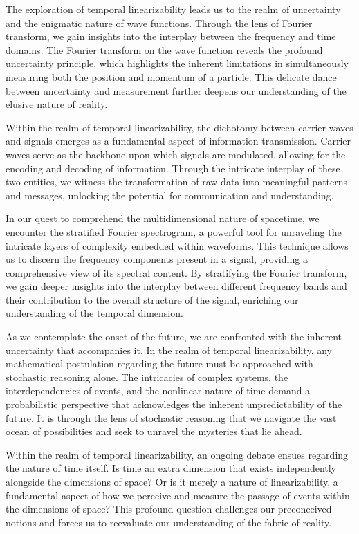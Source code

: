 \documentclass[ebook,12pt,oneside,openany]{memoir}
\begin{document}
\indent The exploration of temporal linearizability leads us to the realm of uncertainty and the enigmatic nature of wave functions. Through the lens of Fourier transform, we gain insights into the interplay between the frequency and time domains. The Fourier transform on the wave function reveals the profound uncertainty principle, which highlights the inherent limitations in simultaneously measuring both the position and momentum of a particle. This delicate dance between uncertainty and measurement further deepens our understanding of the elusive nature of reality.

\indent Within the realm of temporal linearizability, the dichotomy between carrier waves and signals emerges as a fundamental aspect of information transmission. Carrier waves serve as the backbone upon which signals are modulated, allowing for the encoding and decoding of information. Through the intricate interplay of these two entities, we witness the transformation of raw data into meaningful patterns and messages, unlocking the potential for communication and understanding.

\indent In our quest to comprehend the multidimensional nature of spacetime, we encounter the stratified Fourier spectrogram, a powerful tool for unraveling the intricate layers of complexity embedded within waveforms. This technique allows us to discern the frequency components present in a signal, providing a comprehensive view of its spectral content. By stratifying the Fourier transform, we gain deeper insights into the interplay between different frequency bands and their contribution to the overall structure of the signal, enriching our understanding of the temporal dimension.

\indent As we contemplate the onset of the future, we are confronted with the inherent uncertainty that accompanies it. In the realm of temporal linearizability, any mathematical postulation regarding the future must be approached with stochastic reasoning alone. The intricacies of complex systems, the interdependencies of events, and the nonlinear nature of time demand a probabilistic perspective that acknowledges the inherent unpredictability of the future. It is through the lens of stochastic reasoning that we navigate the vast ocean of possibilities and seek to unravel the mysteries that lie ahead.

\indent Within the realm of temporal linearizability, an ongoing debate ensues regarding the nature of time itself. Is time an extra dimension that exists independently alongside the dimensions of space? Or is it merely a nature of linearizability, a fundamental aspect of how we perceive and measure the passage of events within the dimensions of space? This profound question challenges our preconceived notions and forces us to reevaluate our understanding of the fabric of reality.
\end{document}
